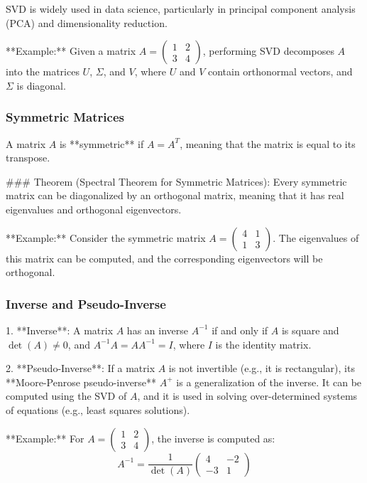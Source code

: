 \documentclass{article}
\begin{document}
SVD is widely used in data science, particularly in principal component analysis (PCA) and dimensionality reduction.

**Example:**
Given a matrix \( A = \begin{pmatrix} 1 & 2 \\ 3 & 4 \end{pmatrix} \), performing SVD decomposes \( A \) into the matrices \( U \), \( \Sigma \), and \( V \), where \( U \) and \( V \) contain orthonormal vectors, and \( \Sigma \) is diagonal.

\subsubsection*{Symmetric Matrices}

A matrix \( A \) is **symmetric** if \( A = A^T \), meaning that the matrix is equal to its transpose.

### Theorem (Spectral Theorem for Symmetric Matrices):
Every symmetric matrix can be diagonalized by an orthogonal matrix, meaning that it has real eigenvalues and orthogonal eigenvectors.

**Example:**
Consider the symmetric matrix \( A = \begin{pmatrix} 4 & 1 \\ 1 & 3 \end{pmatrix} \). The eigenvalues of this matrix can be computed, and the corresponding eigenvectors will be orthogonal.

\subsubsection*{Inverse and Pseudo-Inverse}

1. **Inverse**: A matrix \( A \) has an inverse \( A^{-1} \) if and only if \( A \) is square and \( \det(A) \neq 0 \), and \( A^{-1} A = A A^{-1} = I \), where \( I \) is the identity matrix.

2. **Pseudo-Inverse**: If a matrix \( A \) is not invertible (e.g., it is rectangular), its **Moore-Penrose pseudo-inverse** \( A^+ \) is a generalization of the inverse. It can be computed using the SVD of \( A \), and it is used in solving over-determined systems of equations (e.g., least squares solutions).

**Example:**
For \( A = \begin{pmatrix} 1 & 2 \\ 3 & 4 \end{pmatrix} \), the inverse is computed as:
\[
A^{-1} = \frac{1}{\det(A)} \begin{pmatrix} 4 & -2 \\ -3 & 1 \end{pmatrix}
\]
\end{document}
